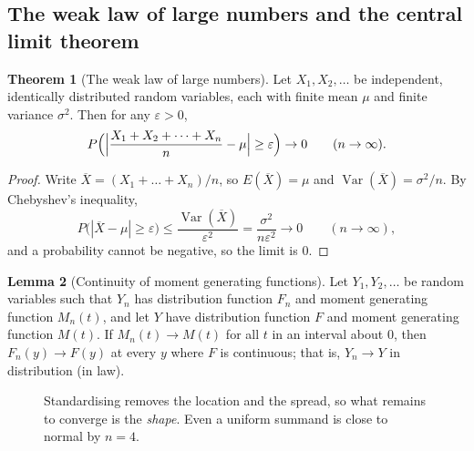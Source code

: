 \documentclass[11pt,a4paper]{article}
\theoremstyle{definition}
\newtheorem{thm}{Theorem}[subsection]
\newtheorem{lem}[thm]{Lemma}
\DeclareMathOperator{\Var}{Var}
\begin{document}
\subsection{The weak law of large numbers and the central limit theorem}
\begin{thm}[The weak law of large numbers]\label{thm:wlln}
Let $X_1, X_2, \dots$ be independent, identically distributed random variables, each with finite mean $\mu$ and finite variance $\sigma^2$. Then for
any $\varepsilon > 0$,
\[
P\Bigl(\Bigl|\frac{X_1 + X_2 + \dots + X_n}{n} - \mu\Bigr| \ge \varepsilon\Bigr) \to 0 \qquad (n \to \infty) .
\]
\end{thm}

\begin{proof}
Write $\overline X = (X_1 + \dots + X_n)/n$, so $E(\overline X) = \mu$ and $\Var(\overline X) = \sigma^2/n$. By Chebyshev's inequality,
\[
P\bigl(|\overline X - \mu| \ge \varepsilon\bigr) \le \frac{\Var(\overline X)}{\varepsilon^2} = \frac{\sigma^2}{n\varepsilon^2} \to 0 \qquad (n \to \infty) ,
\]
and a probability cannot be negative, so the limit is $0$.
\end{proof}

\begin{lem}[Continuity of moment generating functions]\label{lem:mgf-continuity}
Let $Y_1, Y_2, \dots$ be random variables such that $Y_n$ has distribution function $F_n$ and moment generating function $M_n(t)$, and let $Y$ have distribution
function $F$ and moment generating function $M(t)$. If $M_n(t) \to M(t)$ for all $t$ in an interval about $0$, then $F_n(y) \to F(y)$ at every $y$ where $F$ is
continuous; that is, $Y_n \to Y$ in distribution (in law).
\end{lem}

\begin{figure}[H]
\centering
{}
\caption{Standardising removes the location and the spread, so what remains to
converge is the \emph{shape}. Even a uniform summand is close to normal by
$n=4$.}
\end{figure}
\end{document}
